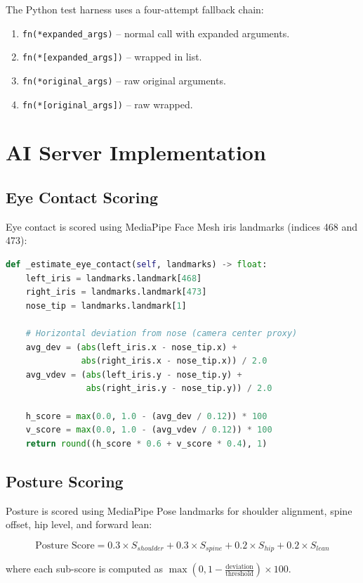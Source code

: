 The Python test harness uses a four-attempt fallback chain:
\begin{enumerate}
    \item \texttt{fn(*expanded\_args)} -- normal call with expanded arguments.
    \item \texttt{fn(*[expanded\_args])} -- wrapped in list.
    \item \texttt{fn(*original\_args)} -- raw original arguments.
    \item \texttt{fn(*[original\_args])} -- raw wrapped.
\end{enumerate}

\section{AI Server Implementation}

\subsection{Eye Contact Scoring}

Eye contact is scored using MediaPipe Face Mesh iris landmarks (indices 468 and 473):

\begin{lstlisting}[language=Python, caption={Eye Contact Scoring}]
def _estimate_eye_contact(self, landmarks) -> float:
    left_iris = landmarks.landmark[468]
    right_iris = landmarks.landmark[473]
    nose_tip = landmarks.landmark[1]
    
    # Horizontal deviation from nose (camera center proxy)
    avg_dev = (abs(left_iris.x - nose_tip.x) + 
               abs(right_iris.x - nose_tip.x)) / 2.0
    avg_vdev = (abs(left_iris.y - nose_tip.y) + 
                abs(right_iris.y - nose_tip.y)) / 2.0
    
    h_score = max(0.0, 1.0 - (avg_dev / 0.12)) * 100
    v_score = max(0.0, 1.0 - (avg_vdev / 0.12)) * 100
    return round((h_score * 0.6 + v_score * 0.4), 1)
\end{lstlisting}

\subsection{Posture Scoring}

Posture is scored using MediaPipe Pose landmarks for shoulder alignment, spine offset, hip level, and forward lean:

\begin{equation}
\text{Posture Score} = 0.3 \times S_{shoulder} + 0.3 \times S_{spine} + 0.2 \times S_{hip} + 0.2 \times S_{lean}
\end{equation}

where each sub-score is computed as $\max(0, 1 - \frac{\text{deviation}}{\text{threshold}}) \times 100$.
